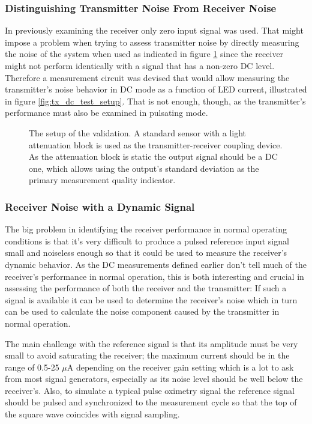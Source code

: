 \subsubsection{Distinguishing Transmitter Noise From Receiver Noise}

In previously examining the receiver only zero input signal was used. That might impose a problem when trying to assess transmitter noise by directly measuring the noise of the system when used as indicated in figure \ref{fig:validation_system_setup} since the receiver might not perform identically with a signal that has a non-zero DC level. Therefore a measurement circuit was devised that would allow measuring the transmitter's noise behavior in DC mode as a function of LED current, illustrated in figure \ref{fig:tx_dc_test_setup}. That is not enough, though, as the transmitter's performance must also be examined in pulsating mode.

\begin{figure}[htcb]
\caption{The setup of the validation. A standard sensor with a light attenuation block is used as the transmitter-receiver coupling device. As the attenuation block is static the output signal should be a DC one, which allows using the output's standard deviation as the primary measurement quality indicator.}
\label{fig:validation_system_setup}
\end{figure}

\subsubsection{Receiver Noise with a Dynamic Signal}

The big problem in identifying the receiver performance in normal operating conditions is that it's very difficult to produce a pulsed reference input signal small and noiseless enough so that it could be used to measure the receiver's dynamic behavior. As the DC measurements defined earlier don't tell much of the receiver's performance in normal operation, this is both interesting and crucial in assessing the performance of both the receiver and the transmitter: If such a signal is available it can be used to determine the receiver's noise which in turn can be used to calculate the noise component caused by the transmitter in normal operation.

The main challenge with the reference signal is that its amplitude must be very small to avoid saturating the receiver; the maximum current should be in the range of 0.5-25 $\mu$A depending on the receiver gain setting which is a lot to ask from most signal generators, especially as its noise level should be well below the receiver's. Also, to simulate a typical pulse oximetry signal the reference signal should be pulsed and synchronized to the measurement cycle so that the top of the square wave coincides with signal sampling.

